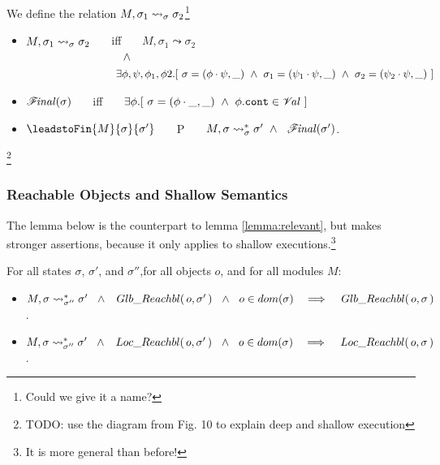 {
\begin{definition}
\label{def:shallow:term}
We define the relation  $M, \sigma_1 \leadsto_{\sigma} \sigma_2$\footnote{Could we give it a name? }
\begin{itemize}
\item
$M, \sigma_1 \leadsto_{\sigma} \sigma_2$ \ \ \ iff \ \ \  ${M, \sigma_1} \leadsto {\sigma_2}$\\
$\strut  \hspace{3cm} \wedge $\\
$\strut  \hspace{2.7cm}\ \    \exists \phi,\psi, \phi_1, \phi2.[ \ \sigma = (\phi\cdot\psi,\_) \ \wedge \ \sigma_1 = (\psi_1\cdot \psi, \_)
\ \wedge\ \sigma_2 = (\psi_2\cdot \psi, \_)\ ] $ 
\item
${\mathcal F}\!\mathit{inal}(\sigma)$ \ \ \ iff \ \ \  $\exists \phi. [\ \sigma = (\phi\cdot\_,\_) \ \wedge \ \phi.\texttt{cont} \in {\mathcal V}\!\mathit{al} \ ]$
\item
$\leadstoFin {M} {\sigma} {\sigma'}$ \ \ \ P \ \ \  $\leadstoRecStar {M} {\sigma} {\sigma} {\sigma'} \ \wedge \ \ \Final{\sigma'}$.
\end{itemize}
\end{definition}
}

\footnote{TODO: use the diagram from Fig. 10 to explain deep and shallow execution}

\subsubsection{{Reachable  Objects and Shallow Semantics}}


The lemma below is the counterpart to lemma \ref{lemma:relevant}, but makes stronger assertions, because it only applies to shallow executions.\footnote{{It is more general than before!}}

\begin{lemma}
For all states $\sigma$, $\sigma'$, and $\sigma''$,for all objects $o$, and for all modules  $M$:
\begin{itemize}
\item
${\leadstoRecStar {M}  {\sigma} {\sigma''} {\sigma'}} \ \ \wedge \ \  \GRelevant o {\sigma'} \ \ \wedge\ \ o\in dom(\sigma)\ \ \ \Longrightarrow \ \  \ \GRelevant o {\sigma}$.
\item
${\leadstoRecStar {M}  {\sigma}  {\sigma''} {\sigma'}} \ \ \wedge \ \   \LRelevant o {\sigma'}\  \ \wedge\ \ o\in dom(\sigma)\ \ \ \Longrightarrow \ \ \ \LRelevant o {\sigma}$.
\end{itemize}
\end{lemma}



